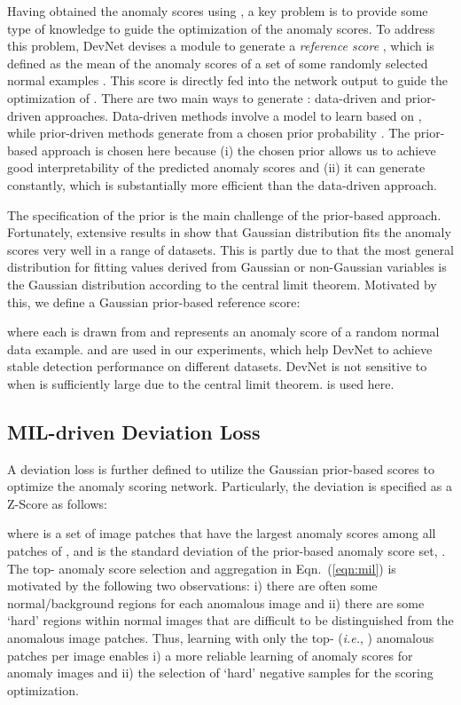 \documentclass[10pt,journal,compsoc]{IEEEtran}
\newcommand{\ie}{\textit{i.e.}}
\begin{document}
Having obtained the anomaly scores using , a key problem is to provide some type of knowledge to guide the optimization of the anomaly scores. To address this problem, DevNet devises a module to generate a \textit{reference score} , which is defined as the mean of the anomaly scores of a set of some randomly selected normal examples . This score is directly fed into the network output to guide the optimization of . There are two main ways to generate : data-driven and prior-driven approaches. Data-driven methods involve a model to learn  based on , while prior-driven methods generate  from a chosen prior probability . The prior-based approach is chosen here because (i) the chosen prior allows us to achieve good interpretability of the predicted anomaly scores and (ii) it can generate  constantly, which is substantially more efficient than the data-driven approach.

The specification of the prior is the main challenge of the prior-based approach. Fortunately, extensive results in \cite{kriegel2011interpreting} show that Gaussian distribution fits the anomaly scores very well in a range of datasets. This is partly due to that the most general distribution for fitting values derived from Gaussian or non-Gaussian variables is the Gaussian distribution according to the central limit theorem. Motivated by this, we define a Gaussian prior-based reference score:

where each  is drawn from  and represents an anomaly score of a random normal data example. 
 and  are used in our experiments, which help DevNet to achieve stable detection performance on different datasets. DevNet is not sensitive to  when  is sufficiently large due to the central limit theorem.  is used here. 


\subsection{MIL-driven Deviation Loss}\label{subsec:loss}

A deviation loss is further defined to utilize the Gaussian prior-based scores to optimize the anomaly scoring network. Particularly, the deviation is specified as a Z-Score as follows:


where  is a set of image patches that have the largest anomaly scores among all patches of , and  is the standard deviation of the prior-based anomaly score set, . The top- anomaly score selection and aggregation in Eqn.~(\ref{eqn:mil}) is motivated by the following two observations: i) there are often some normal/background regions for each anomalous image and ii) there are some `hard' regions within normal images that are difficult to be distinguished from the anomalous image patches. Thus, learning with only the top- (\ie, ) anomalous patches per image enables i) a more reliable learning of anomaly scores for anomaly images and ii) the selection of `hard' negative samples for the scoring optimization.
\end{document}
